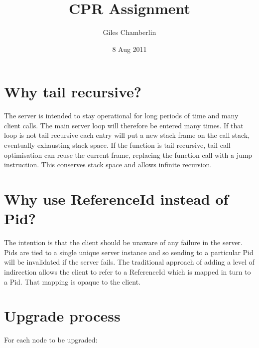 \documentclass[11pt]{article}
\begin{document}
\title{CPR Assignment}
\author{Giles Chamberlin}
\date{8 Aug 2011}
\maketitle



\pagebreak
\section{Why tail recursive?}
\label{sec-1}


The server is intended to stay operational for long periods of time
and many client calls.  The main server loop will therefore be entered
many times.  If that loop is not tail recursive each entry will put a
new stack frame on the call stack, eventually exhausting stack space.
If the function is tail recursive, tail call optimisation can reuse
the current frame, replacing the function call with a jump
instruction.  This conserves stack space and allows infinite
recursion.
\section{Why use ReferenceId instead of Pid?}
\label{sec-2}


The intention is that the client should be unaware of any failure in
the server.  Pids are tied to a single unique server instance and so
sending to a particular Pid will be invalidated if the server fails.
The traditional approach of adding a level of indirection allows the
client to refer to a ReferenceId which is mapped in turn to a Pid.
That mapping is opaque to the client.
\section{Upgrade process}
\label{sec-3}


For each node to be upgraded:
\end{document}
